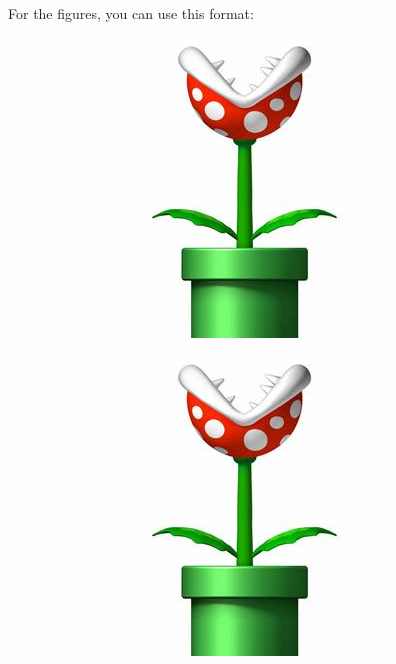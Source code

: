 For the figures, you can use this format:
%
	\begin{figure}[h!]\centering
	\begin{subfigure}{.05\textwidth}%
		\caption{}\label{sfig:secondary1}\vspace*{5cm}
	\end{subfigure}
	\begin{subfigure}{.43\textwidth} 
			\includegraphics[width=\linewidth]{1-Esparcimiento/figs/plant}		
	\end{subfigure}
	\begin{subfigure}{.05\textwidth}%
		\vspace{-5cm}\caption{}\label{sfig:secondaty2}
		\end{subfigure}
	\begin{subfigure}{.43\textwidth} 
			\includegraphics[width=\linewidth]{1-Esparcimiento/figs/plant}

\end{subfigure}
\end{figure}
